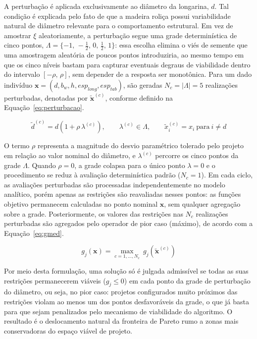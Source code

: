 A perturbação é aplicada exclusivamente ao diâmetro da longarina, $d$. Tal condição é explicada pelo fato de que a madeira roliça possui variabilidade natural de diâmetro relevante para o comportamento estrutural. Em vez de amostrar $\xi$ aleatoriamente, a perturbação segue uma grade determinística de cinco pontos, $\Lambda = \{-1,\,-\tfrac{1}{2},\,0,\,\tfrac{1}{2},\,1\}$: essa escolha elimina o viés de semente que uma amostragem aleatória de poucos pontos introduziria, ao mesmo tempo em que os cinco níveis bastam para capturar eventuais degraus de viabilidade dentro do intervalo $[-\rho,\,\rho]$, sem depender de a resposta ser monotônica.
Para um dado indivíduo $\mathbf{x} = (d,\allowbreak b_w,\allowbreak h,\allowbreak esp_{long},\allowbreak esp_{tab})$, são geradas $N_c = |\Lambda| = 5$ realizações perturbadas, denotadas por $\tilde{\mathbf{x}}^{(c)}$, conforme definido na Equação~\eqref{eq:perturbacao}.

 \begin{equation}\tilde{d}^{(c)} = d\left(1 + \rho\,\lambda^{(c)}\right),\qquad \lambda^{(c)} \in \Lambda,\qquad \tilde{x}_i^{(c)} = x_i \ \text{para}\ i \neq d\label{eq:perturbacao}
 \end{equation}

O termo $\rho$ representa a magnitude do desvio paramétrico tolerado pelo projeto em relação ao valor nominal do diâmetro, e $\lambda^{(c)}$ percorre os cinco pontos da grade $\Lambda$.
Quando $\rho = 0$, a grade colapsa para o único ponto $\lambda = 0$ e o procedimento se reduz à avaliação determinística padrão ($N_c = 1$).
Em cada ciclo, as avaliações perturbadas são processadas independentemente no modelo analítico, porém apenas as restrições são reavaliadas nesses pontos: as funções objetivo permanecem calculadas no ponto nominal $\mathbf{x}$, sem qualquer agregação sobre a grade.
Posteriormente, os valores das restrições nas $N_c$ realizações perturbadas são agregados pelo operador de pior caso (máximo), de acordo com a Equação~\eqref{eq:gmed}.

 \begin{equation}g_j(\mathbf{x}) = \max_{c=1,\ldots,N_c}\ g_j\!\left(\tilde{\mathbf{x}}^{(c)}\right)
 \label{eq:gmed}
 \end{equation}

Por meio desta formulação, uma solução só é julgada admissível se todas as suas restrições permanecerem viáveis ($g_j \leq 0$) em cada ponto da grade de perturbação do diâmetro, ou seja, no pior caso: projetos configurados muito próximos das restrições violam ao menos um dos pontos desfavoráveis da grade, o que já basta para que sejam penalizados pelo mecanismo de viabilidade do algoritmo.
O resultado é o deslocamento natural da fronteira de Pareto rumo a zonas mais conservadoras do espaço viável de projeto.

